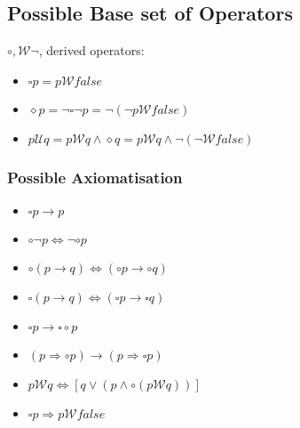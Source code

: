 \documentclass[a4paper, 10pt]{article}
\begin{document}
\begin{multicols}{2}
\subsection*{Possible Base set of Operators}
$\circ, \mathcal{W}\neg$, derived operators:
\begin{itemize}
    \item $\square p = p \mathcal{W} false$
    \item $\diamond p=\neg\square\neg p=\neg(\neg p \mathcal{W}false)$
    \item $p \mathcal{U}q=p \mathcal{W}q \wedge \diamond q = p \mathcal{W}q \wedge\neg(\neg \mathcal{W}false)$
\end{itemize}
\subsubsection*{Possible Axiomatisation}
\begin{itemize}
    \item $\square p\to p$
    \item $\circ\neg p\Leftrightarrow\neg\circ p$
    \item $\circ(p\to q)\Leftrightarrow(\circ p\to\circ q)$
    \item $\square(p\to q)\Leftrightarrow(\square p \to \square q)$
    \item $\square p\to\square\circ p$
    \item $(p\Rightarrow\circ p)\to(p\Rightarrow\square p)$
    \item $p \mathcal{W}q\Leftrightarrow[q\vee(p\wedge\circ(p \mathcal{W}q))]$
    \item $\square p\Rightarrow p \mathcal{W}false$
\end{itemize}
\end{multicols}
\end{document}
